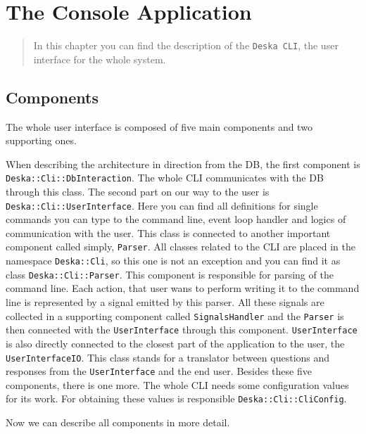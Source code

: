 \documentclass[deska]{subfiles}
\begin{document}
\chapter{The Console Application}
\label{sec:cli-app}

\begin{abstract}

In this chapter you can find the description of the {\tt Deska CLI}, the user interface for the whole system.

\end{abstract}

\section{Components}

The whole user interface is composed of five main components and two supporting ones.

When describing the architecture in direction from the DB, the first component is {\tt Deska::Cli::DbInteraction}. The 
whole CLI communicates with the DB through this class. The second part on our way to the user is {\tt Deska::Cli::UserInterface}.
Here you can find all definitions for single commands you can type to the command line, 
event loop handler and logics of communication with the user. This class is connected to another important component 
called simply, {\tt Parser}. All classes related to the CLI are placed in the namespace {\tt Deska::Cli}, so this one is not an 
exception and you can find it as class {\tt Deska::Cli::Parser}. This component is responsible for parsing of the 
command line. Each action, that user wans to perform writing it to the command line is represented by a signal emitted 
by this parser. All these signals are collected in a supporting component called {\tt SignalsHandler} and the {\tt Parser}
is then connected with the {\tt UserInterface} through this component. {\tt UserInterface} is also directly 
connected to the closest part of the application to the user, the {\tt UserInterfaceIO}. This class stands for a 
translator between questions and responses from the {\tt UserInterface} and the end user. Besides these five 
components, there is one more. The whole CLI needs some configuration values for its work. For obtaining these values 
is responsible {\tt Deska::Cli::CliConfig}.


Now we can describe all components in more detail.
\end{document}
